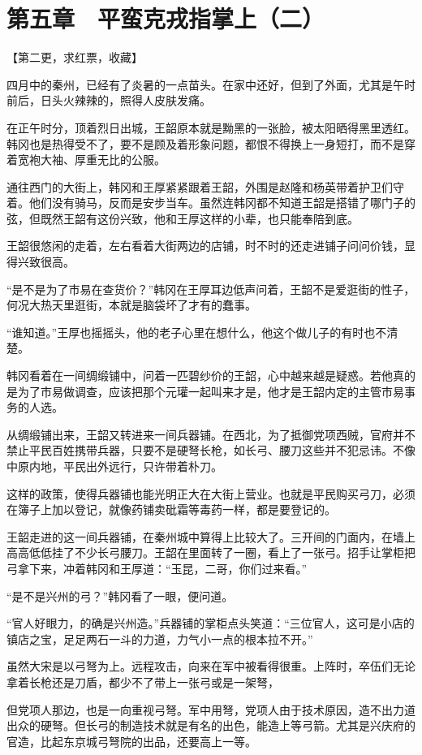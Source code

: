\section{第五章　平蛮克戎指掌上（二）}

【第二更，求红票，收藏】

四月中的秦州，已经有了炎暑的一点苗头。在家中还好，但到了外面，尤其是午时前后，日头火辣辣的，照得人皮肤发痛。

在正午时分，顶着烈日出城，王韶原本就是黝黑的一张脸，被太阳晒得黑里透红。韩冈也是热得受不了，要不是顾及着形象问题，都恨不得换上一身短打，而不是穿着宽袍大袖、厚重无比的公服。

通往西门的大街上，韩冈和王厚紧紧跟着王韶，外围是赵隆和杨英带着护卫们守着。他们没有骑马，反而是安步当车。虽然连韩冈都不知道王韶是搭错了哪门子的弦，但既然王韶有这份兴致，他和王厚这样的小辈，也只能奉陪到底。

王韶很悠闲的走着，左右看着大街两边的店铺，时不时的还走进铺子问问价钱，显得兴致很高。

“是不是为了市易在查货价？”韩冈在王厚耳边低声问着，王韶不是爱逛街的性子，何况大热天里逛街，本就是脑袋坏了才有的蠢事。

“谁知道。”王厚也摇摇头，他的老子心里在想什么，他这个做儿子的有时也不清楚。

韩冈看着在一间绸缎铺中，问着一匹碧纱价的王韶，心中越来越是疑惑。若他真的是为了市易做调查，应该把那个元瓘一起叫来才是，他才是王韶内定的主管市易事务的人选。

从绸缎铺出来，王韶又转进来一间兵器铺。在西北，为了抵御党项西贼，官府并不禁止平民百姓携带兵器，只要不是硬弩长枪，如长弓、腰刀这些并不犯忌讳。不像中原内地，平民出外远行，只许带着朴刀。

这样的政策，使得兵器铺也能光明正大在大街上营业。也就是平民购买弓刀，必须在簿子上加以登记，就像药铺卖砒霜等毒药一样，都是要登记的。

王韶走进的这一间兵器铺，在秦州城中算得上比较大了。三开间的门面内，在墙上高高低低挂了不少长弓腰刀。王韶在里面转了一圈，看上了一张弓。招手让掌柜把弓拿下来，冲着韩冈和王厚道：“玉昆，二哥，你们过来看。”

“是不是兴州的弓？”韩冈看了一眼，便问道。

“官人好眼力，的确是兴州造。”兵器铺的掌柜点头笑道：“三位官人，这可是小店的镇店之宝，足足两石一斗的力道，力气小一点的根本拉不开。”

虽然大宋是以弓弩为上。远程攻击，向来在军中被看得很重。上阵时，卒伍们无论拿着长枪还是刀盾，都少不了带上一张弓或是一架弩，

但党项人那边，也是一向重视弓弩。军中用弩，党项人由于技术原因，造不出力道出众的硬弩。但长弓的制造技术就是有名的出色，能造上等弓箭。尤其是兴庆府的官造，比起东京城弓弩院的出品，还要高上一等。

